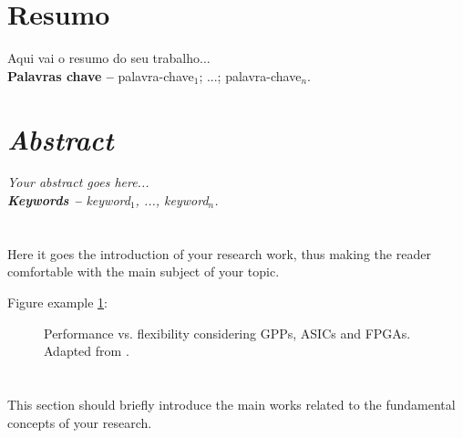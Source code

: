 \documentclass[12pt, a4paper]{article}
\begin{document}
\makeourtitle

\tableofcontents

\newpage
\section*{Resumo}
Aqui vai o resumo do seu trabalho...\\%


\textbf{Palavras chave --} palavra-chave$_1$; ...; palavra-chave$_n$.


\newpage
\section*{\textit{Abstract}}
\textit{Your abstract goes here...}\\%

\textit{\textbf{Keywords --} keyword$_1$, ..., keyword$_n$.}


\newpage
\section{\sectionI}
\label{sec:intro}
Here it goes the introduction of your research work, thus making the reader comfortable with the main subject of your topic.

Figure example \ref{fig:perf_flex}:

\begin{figure}[ht]
	\centering
	\caption{Performance vs. flexibility considering GPPs, ASICs and FPGAs.
	  Adapted from \cite{Bobda2007a}.}
	\label{fig:perf_flex}
\end{figure}

\section{\sectionII}
\label{sec:rel-work}
This section should briefly introduce the main works related to the fundamental concepts of your research.
\end{document}
